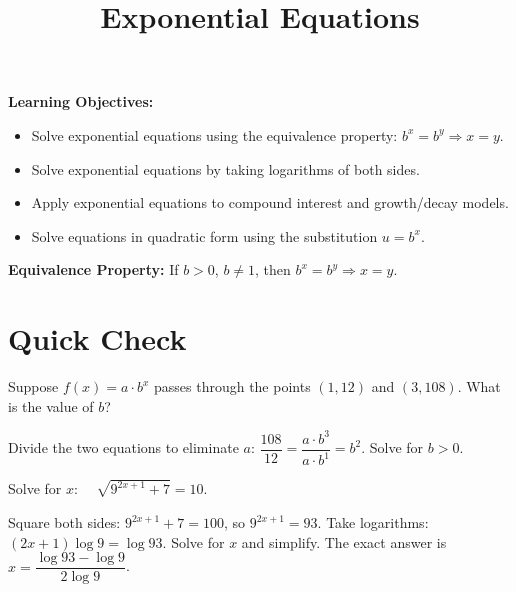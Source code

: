 \documentclass{ximera}
\title{Exponential Equations}
\begin{document}
\begin{abstract}
\end{abstract}
\maketitle

\textbf{Learning Objectives:}
\begin{itemize}
  \item Solve exponential equations using the equivalence property: $b^x=b^y \Rightarrow x=y$.
  \item Solve exponential equations by taking logarithms of both sides.
  \item Apply exponential equations to compound interest and growth/decay models.
  \item Solve equations in quadratic form using the substitution $u=b^x$.
\end{itemize}
\medskip

\noindent\textbf{Equivalence Property:} If $b>0$, $b\neq1$, then $b^x = b^y \Rightarrow x=y$.

\bigskip
\section*{Quick Check}

\begin{problem}
Suppose $f(x) = a\cdot b^x$ passes through the points $(1,12)$ and $(3,108)$. What is the value of $b$?
\begin{hint}
Divide the two equations to eliminate $a$: $\dfrac{108}{12} = \dfrac{a\cdot b^3}{a\cdot b^1} = b^2$. Solve for $b>0$.
\end{hint}
\begin{multipleChoice}
\end{multipleChoice}
\end{problem}

\begin{problem}
Solve for $x$: $\quad\sqrt{9^{2x+1}+7} = 10$.
\begin{hint}
Square both sides: $9^{2x+1}+7=100$, so $9^{2x+1}=93$. Take logarithms: $(2x+1)\log 9 = \log 93$. Solve for $x$ and simplify. The exact answer is $x = \dfrac{\log 93 - \log 9}{2\log 9}$.
\end{hint}
\begin{multipleChoice}
\end{multipleChoice}
\end{problem}
\end{document}
